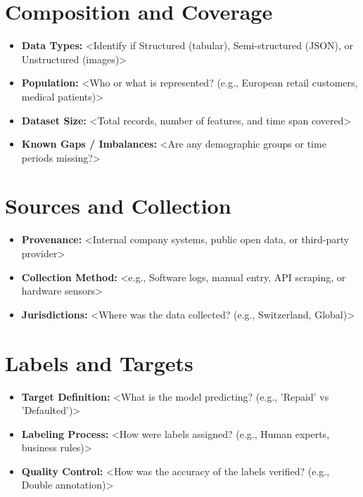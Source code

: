 \documentclass[11pt, a4paper]{article}
\begin{document}
\section{Composition and Coverage}
\begin{itemize}
    \item \textbf{Data Types:} <Identify if Structured (tabular), Semi-structured (JSON), or Unstructured (images)>
    \item \textbf{Population:} <Who or what is represented? (e.g., European retail customers, medical patients)>
    \item \textbf{Dataset Size:} <Total records, number of features, and time span covered>
    \item \textbf{Known Gaps / Imbalances:} <Are any demographic groups or time periods missing?>
\end{itemize}

\section{Sources and Collection}
\begin{itemize}
    \item \textbf{Provenance:} <Internal company systems, public open data, or third-party provider>
    \item \textbf{Collection Method:} <e.g., Software logs, manual entry, API scraping, or hardware sensors>
    \item \textbf{Jurisdictions:} <Where was the data collected? (e.g., Switzerland, Global)>
\end{itemize}

\section{Labels and Targets}
\begin{itemize}
    \item \textbf{Target Definition:} <What is the model predicting? (e.g., 'Repaid' vs 'Defaulted')>
    \item \textbf{Labeling Process:} <How were labels assigned? (e.g., Human experts, business rules)>
    \item \textbf{Quality Control:} <How was the accuracy of the labels verified? (e.g., Double annotation)>
\end{itemize}

\end{document}
